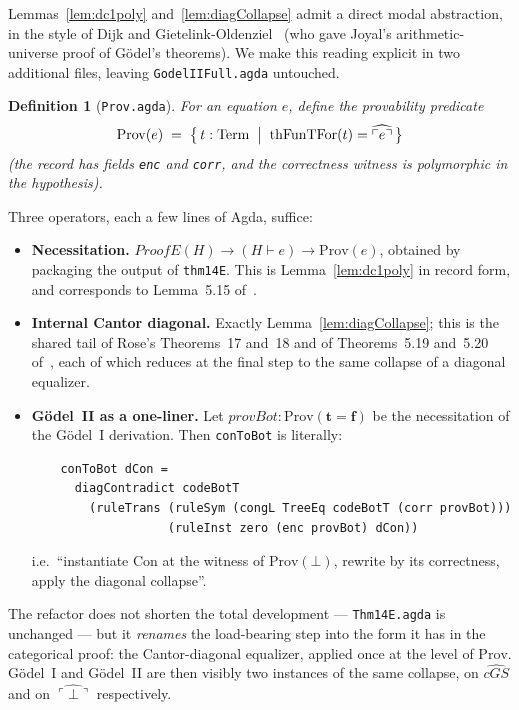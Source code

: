 \documentclass[11pt]{article}
\newtheorem{definition}[theorem]{Definition}
\newcommand{\trueT}{\mathbf{t}}
\newcommand{\falseT}{\mathbf{f}}
\newcommand{\code}[1]{\ulcorner #1 \urcorner}
\newcommand{\reify}[1]{\widehat{#1}}
\newcommand{\thFunTFor}{\mathrm{thFunTFor}}
\begin{document}
Lemmas~\ref{lem:dc1poly} and~\ref{lem:diagCollapse} admit a
direct modal abstraction, in the style of Dijk and
Gietelink-Oldenziel~\cite{dijk2020} (who gave Joyal's
arithmetic-universe proof of G\"odel's theorems).  We make this
reading explicit in two additional files, leaving
\texttt{GodelIIFull.agda} untouched.

\begin{definition}[\texttt{Prov.agda}]
For an equation $e$, define the provability predicate
\[
  \mathrm{Prov}(e) \;=\; \bigl\{\, t : \mathrm{Term}
    \;\bigm|\; \thFunTFor(t) = \reify{\code{e}} \,\bigr\}
\]
(the record has fields \texttt{enc} and \texttt{corr}, and the
correctness witness is polymorphic in the hypothesis).
\end{definition}

\noindent
Three operators, each a few lines of Agda, suffice:
\begin{itemize}
\item \textbf{Necessitation.}
  $\mathit{ProofE}(H) \to (H \vdash e) \to \mathrm{Prov}(e)$,
  obtained by packaging the output of \texttt{thm14E}.  This is
  Lemma~\ref{lem:dc1poly} in record form, and corresponds to
  Lemma~5.15 of~\cite{dijk2020}.
\item \textbf{Internal Cantor diagonal.}
  Exactly Lemma~\ref{lem:diagCollapse}; this is the shared tail
  of Rose's Theorems~17 and~18 and of Theorems~5.19 and~5.20
  of~\cite{dijk2020}, each of which reduces at the final step to
  the same collapse of a diagonal equalizer.
\item \textbf{G\"odel~II as a one-liner.}  Let
  $\mathit{provBot} : \mathrm{Prov}(\trueT = \falseT)$ be the
  necessitation of the G\"odel~I derivation.  Then
  \texttt{conToBot} is literally:
\begin{verbatim}
    conToBot dCon =
      diagContradict codeBotT
        (ruleTrans (ruleSym (congL TreeEq codeBotT (corr provBot)))
                   (ruleInst zero (enc provBot) dCon))
\end{verbatim}
  i.e.\ ``instantiate $\mathrm{Con}$ at the witness of
  $\mathrm{Prov}(\bot)$, rewrite by its correctness, apply the
  diagonal collapse''.
\end{itemize}

\noindent
The refactor does not shorten the total development ---
\texttt{Thm14E.agda} is unchanged --- but it \emph{renames} the
load-bearing step into the form it has in the categorical proof:
the Cantor-diagonal equalizer, applied once at the level of
$\mathrm{Prov}$.  G\"odel~I and G\"odel~II are then visibly two
instances of the same collapse, on $\reify{\mathit{cGS}}$ and
on $\reify{\code{\bot}}$ respectively.
\end{document}
